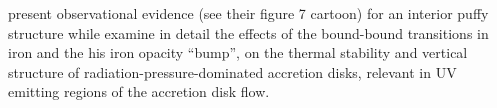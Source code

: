 \citet{Gardner_Done2017} present observational evidence (see their
figure 7 cartoon) for an interior puffy structure while
\citet{Jiang_Stone_Davis2016} examine in detail the effects of the
bound-bound transitions in iron and the his iron opacity ``bump'', on
the thermal stability and vertical structure of
radiation-pressure-dominated accretion disks, relevant in UV emitting
regions of the accretion disk flow.
